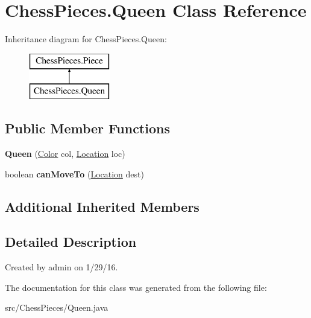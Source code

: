 \hypertarget{class_chess_pieces_1_1_queen}{}\section{Chess\+Pieces.\+Queen Class Reference}
\label{class_chess_pieces_1_1_queen}
Inheritance diagram for Chess\+Pieces.\+Queen\+:\begin{figure}[H]
\begin{center}
\leavevmode
\includegraphics[height=2.000000cm]{class_chess_pieces_1_1_queen}
\end{center}
\end{figure}
\subsection*{Public Member Functions}
\begin{DoxyCompactItemize}
\item 
{\bfseries Queen} (\hyperlink{enum_chess_pieces_1_1_color}{Color} col, \hyperlink{class_chess_pieces_1_1_location}{Location} loc)\hypertarget{class_chess_pieces_1_1_queen_a550dcb93755a0825d6f8b716de4aa07a}{}\label{class_chess_pieces_1_1_queen_a550dcb93755a0825d6f8b716de4aa07a}

\item 
boolean {\bfseries can\+Move\+To} (\hyperlink{class_chess_pieces_1_1_location}{Location} dest)\hypertarget{class_chess_pieces_1_1_queen_a6b8f855055f75a8dcfeec17eb0b7f121}{}\label{class_chess_pieces_1_1_queen_a6b8f855055f75a8dcfeec17eb0b7f121}

\end{DoxyCompactItemize}
\subsection*{Additional Inherited Members}


\subsection{Detailed Description}
Created by admin on 1/29/16. 

The documentation for this class was generated from the following file\+:\begin{DoxyCompactItemize}
\item 
src/\+Chess\+Pieces/Queen.\+java\end{DoxyCompactItemize}
